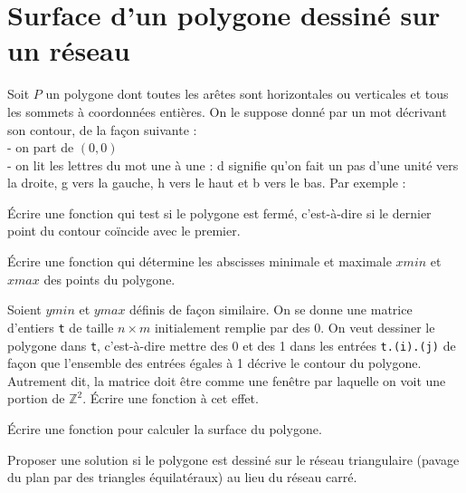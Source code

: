 \renewcommand{\SourceFile}{6-geometrie-et-images/src/6-2.ml}

\section{Surface d'un polygone dessiné sur un réseau}

Soit $P$ un polygone dont toutes les arêtes sont horizontales ou verticales et tous les sommets à coordonnées entières. On le suppose donné par un mot décrivant son contour, de la façon suivante :\\
- on part de $(0,0)$\\
- on lit les lettres du mot une à une : \og d \fg{} signifie qu'on fait un pas d'une unité vers la droite, \og g \fg{} vers la gauche, \og h \fg{} vers le haut et \og b \fg{} vers le bas. Par exemple :
\medskip

\begin{center}
\end{center}

\Q
Écrire une fonction qui test si le polygone est fermé, c'est-à-dire si le dernier point du contour coïncide avec le premier.

\Q
Écrire une fonction qui détermine les abscisses minimale et maximale $xmin$ et $xmax$ des points du polygone.

\Q
Soient $ymin$ et $ymax$ définis de façon similaire. On se donne une matrice d'entiers \texttt{t} de taille $n \times m$ initialement remplie par des 0. On veut \og dessiner \fg{} le polygone dans \texttt{t}, c'est-à-dire mettre des 0 et des 1 dans les entrées \texttt{t.(i).(j)} de façon que l'ensemble des entrées égales à 1 décrive le contour du polygone. Autrement dit, la matrice doit être comme une \og fenêtre \fg{} par laquelle on voit une portion de $\mathbb{Z}^2$. Écrire une fonction à cet effet.

\Q
Écrire une fonction pour calculer la surface du polygone.

\Q
Proposer une solution si le polygone est dessiné sur le réseau triangulaire (pavage du plan par des triangles équilatéraux) au lieu du réseau carré.


